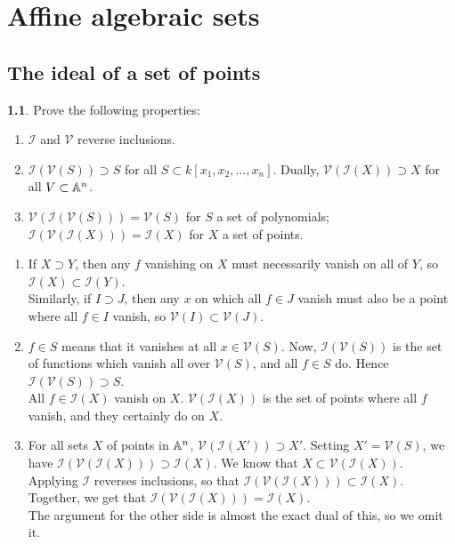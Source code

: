 \documentclass{book}
\newcommand{\I}[1]{\mathcal{I}(#1)}
\newcommand{\V}[1]{\mathcal{V}(#1)}
\newcommand{\kn}{k[x_1,x_2,\ldots,x_n]}
\newcommand{\Af}{{\Bbb A}^n}
\theoremstyle{definition}
\theoremstyle{block}
\newtheorem{block*}[block]{}
\theoremstyle{thm}
\begin{document}
\chapter{Affine algebraic sets}

\section{The ideal of a set of points}
\begin{block*}
  Prove the following properties:
  \begin{enumerate}[label=(\alph*)]
    \item $\mathcal I$ and $\mathcal V$ reverse inclusions. 
    \item $\I{\V S}\supset S$ for all $S\subset\kn$. Dually, $\V{\I X}\supset X$
      for all $V\subset\Af$.
    \item $\V{\I{\V S}}=\V S$ for $S$ a set of polynomials; $\I{\V{\I X}}=\I X$
      for $X$ a set of points.
\end{enumerate}
\end{block*}

\begin{enumerate}[label=(\alph*)]
  \item 
    If $X\supset Y$, then any $f$ vanishing on $X$ must necessarily vanish
    on all of $Y$, so $\I X\subset\I Y$.\\
    Similarly, if $I\supset J$, then any $x$ on which all $f\in J$ vanish must
    also be a point where all $f\in I$ vanish, so $\V I\subset\V J$.
  \item
    $f\in S$ means that it vanishes at all $x\in\V S$. Now, $\I{\V S}$ is the
    set of functions which vanish all over $\V S$, and all $f\in S$ do. Hence
    $\I{\V S}\supset S$.\\
    All $f\in\I X$ vanish on $X$. $\V{\I X}$ is the set of points where all $f$ vanish,
    and they certainly do on $X$.
  \item
    For all sets $X$ of points in $\Af$, $\V{\I{X'}}\supset X'$. Setting $X'=\V
    S$, we have $\I{\V{\I X}}\supset \I X$.
    We know that $X \subset\V{\I X}$. Applying $\mathcal I$ reverses
    inclusions, so that $\I{\V{\I X}}\subset\I X$. Together, we get that
    $\I{\V{\I X}} = \I X$.\\
    The argument for the other side is almost the exact dual of this, so we omit
    it. 
\end{enumerate}
\end{document}
